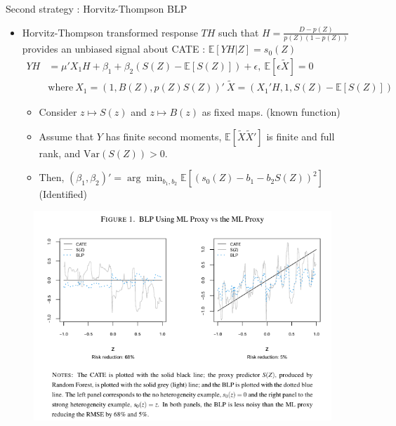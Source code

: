 \documentclass[xcolor=svgnames,aspectratio=169]{beamer}
\newcommand{\E}{\mathbb{E}}
\newcommand{\var}{\text{Var}}
\begin{document}
\begin{frame}{Second strategy : Horvitz-Thompson BLP}
    \begin{itemize}
        \item Horvitz-Thompson transformed response $TH$ such that $H=\frac{D-p(Z)}{p(Z)(1-p(Z))}$ provides an unbiased signal about CATE : $\E[YH|Z]=s_0(Z)$
        \begin{align*}
            YH&=\mu'X_1H+\beta_1+\beta_2(S(Z)-\E[S(Z)])+\epsilon, \ \E[\epsilon\tilde{X}]=0 \\
            &\text{where} \ X_1=(1,B(Z),p(Z)S(Z))' \  \tilde{X}=(X_1'H, 1, S(Z)-\E[S(Z)])
        \end{align*}
        \begin{tcolorbox}[colframe=Cyan,title=Theorem 2]
        \begin{itemize}
            \item Consider $z\mapsto S(z)$ and $z\mapsto B(z)$ as fixed maps. (known function)
            \item Assume that $Y$ has finite second moments, $\E[\tilde{X}\tilde{X}']$ is finite and full rank, and $\var(S(Z))>0$.
            \item Then, $(\beta_1, \beta_2)'=\arg\min_{b_1,b_2}\E[(s_0(Z)-b_1-b_2 S(Z))^2]$ (Identified)
        \end{itemize}
    \end{tcolorbox}
    \end{itemize}
\end{frame}

\begin{frame}
    \begin{figure}
        \includegraphics[width=1.5\textwidth, height=\textheight, keepaspectratio]{CATE.png}
    \end{figure}
\end{frame}
\end{document}
